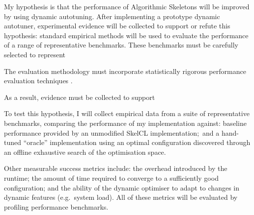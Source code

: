 My hypothesis is that the performance of Algorithmic Skeletons will be
improved by using dynamic autotuning. After implementing a prototype
dynamic autotuner, experimental evidence will be collected to support
or refute this hypothesis: standard empirical methods will be used to
evaluate the performance of a range of representative
benchmarks. These benchmarks must be carefully selected to represent

The evaluation methodology must incorporate statistically rigorous
performance evaluation techniques \cite{Georges2007}.

As a result, evidence must be collected to support

To test this hypothesis, I will
collect empirical data from a suite of representative benchmarks,
comparing the performance of my implementation against: baseline
performance provided by an unmodified SkelCL implementation;\ and a
hand-tuned ``oracle'' implementation using an optimal configuration
discovered through an offline exhaustive search of the optimisation
space.

Other measurable success metrics include: the overhead introduced by
the runtime; the amount of time required to converge to a sufficiently
good configuration; and the ability of the dynamic optimiser to adapt
to changes in dynamic features (e.g.\ system load). All of these
metrics will be evaluated by profiling performance benchmarks.

